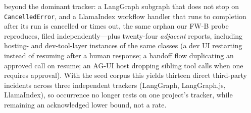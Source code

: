 \documentclass[10pt,journal,compsoc]{IEEEtran}
\begin{document}
beyond the dominant tracker: a LangGraph subgraph that does not stop on
\texttt{CancelledError}, and a LlamaIndex workflow handler that runs to
completion after its run is cancelled or times out, the same orphan our
\textsf{FW-B} probe reproduces, filed independently---plus twenty-four
\emph{adjacent} reports, including hosting- and dev-tool-layer instances of
the same classes (a dev UI restarting instead of resuming after a human
response; a handoff flow duplicating an approved call on resume; an AG-UI
host dropping sibling tool calls when one requires approval). With the seed
corpus this yields thirteen direct third-party incidents across three
independent trackers (LangGraph, LangGraph.js, LlamaIndex), so occurrence no
longer rests on one project's tracker, while remaining an acknowledged lower
bound, not a rate.
\end{document}
